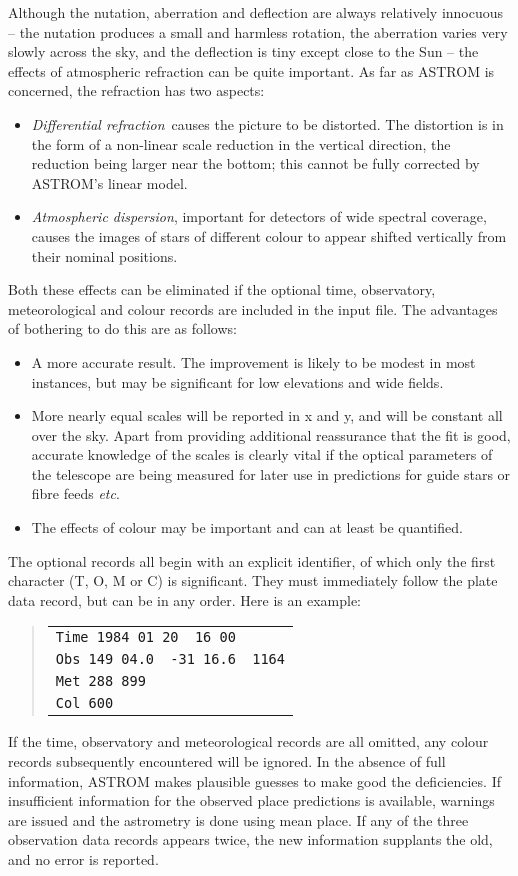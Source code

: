 Although the nutation, aberration
and deflection are always relatively innocuous -- the nutation produces a
small and harmless rotation, the aberration varies very slowly
across the sky, and the deflection is tiny except close to the
Sun -- the effects of atmospheric refraction can be quite
important.  As far as ASTROM is concerned, the refraction has
two aspects:
\begin{itemize}
 \item {\it Differential refraction}\, causes the picture to be
       distorted.  The distortion is in the form of a non-linear scale
       reduction in the vertical direction, the reduction being
       larger near the bottom;  this cannot be fully corrected by
       ASTROM's linear model.
 \item {\it Atmospheric dispersion}, important for detectors of
       wide spectral coverage, causes the images
       of stars of different colour to appear shifted vertically
       from their nominal positions.
\end{itemize}
Both these effects can be eliminated if the
optional time, observatory, meteorological and colour
records are included in the input file.  The advantages
of bothering to do this are as follows:
\begin{itemize}
 \item A more accurate result.  The improvement is likely to be
       modest in most instances, but may be significant for low
       elevations and wide fields.
 \item More nearly equal scales will be reported in x and y,
       and will be constant all over the sky.  Apart from
       providing additional reassurance that the fit is good,
       accurate knowledge of the scales is clearly vital
       if the optical parameters of the
       telescope are being measured for later use in
       predictions for guide stars or fibre feeds {\it etc}.
 \item The effects of colour may be important and can
       at least be quantified.
\end{itemize}
The optional records all begin with an explicit identifier, of
which only the first character (T, O, M or C) is significant.
They must immediately follow the plate data record, but
can be in any order.   Here is an example:
\begin{quote}
\begin{tabular}{|l|}
\hline
\verb|Time 1984 01 20  16 00| \\
\verb|Obs 149 04.0  -31 16.6  1164| \\
\verb|Met 288 899| \\
\verb|Col 600| \\
\hline
\end{tabular}
\end{quote}
If the time, observatory and meteorological records are all
omitted, any colour records
subsequently encountered will be ignored.  In the absence
of full information, ASTROM makes plausible guesses
to make good the deficiencies.
If insufficient information for the
observed place predictions is available, warnings are issued and
the astrometry is done using mean place.
If any of the three observation data records appears twice,
the new information supplants the old, and no error is
reported.

